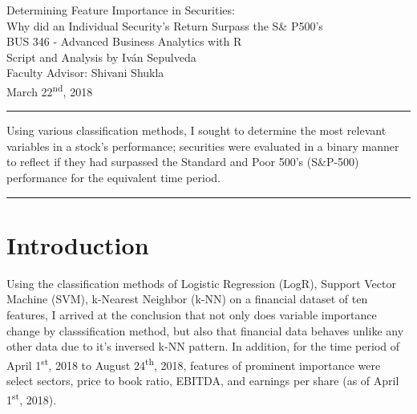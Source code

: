 \documentclass[12pt]{article}
\date{\vspace{-1.5ex}Spring 2019}
\newcommand{\ts}{\textsuperscript}
\begin{document}
	\begingroup  
	\centering
	\LARGE Determining Feature Importance in Securities:\\
	\Large Why did an Individual Security's Return Surpass the S\& P500's\\  \vspace{0.5ex}
	\large BUS 346 - Advanced Business Analytics with R \\
	\large Script and Analysis by Iván Sepulveda 
	\large{ \\ Faculty Advisor: Shivani Shukla}
	\large{ \\ March 22\ts{\hspace{0.25ex}nd}, 2018}\vspace{0.5ex}\par
	\endgroup
	\hrule
	\vspace{1ex}
	Using various classification methods, I sought to determine the most relevant variables in a stock's performance; securities were evaluated in a binary manner to reflect if they had surpassed the Standard and Poor 500's (S\&P-500) performance for the equivalent time period. 
	
	\vspace{0.001cm}
	\hrule
	
	\vspace{-2ex}
	\section*{Introduction}\vspace{-2ex}
	Using the classification methods of Logistic Regression (LogR), Support Vector Machine (SVM), k-Nearest Neighbor (k-NN) on a financial dataset of ten features, I arrived at the conclusion that not only does variable importance change by classsification method, but also that financial data behaves unlike any other data due to it's inversed k-NN pattern. In addition, for the time period of April 1\ts{\hspace{0.25ex}st}, 2018 to August 24\ts{\hspace{0.25ex}th}, 2018, features of prominent importance were select sectors, price to book ratio, EBITDA, and earnings per share (as of April 1\ts{\hspace{0.25ex}st}, 2018).
	\vspace{-3.5ex}
\end{document}
